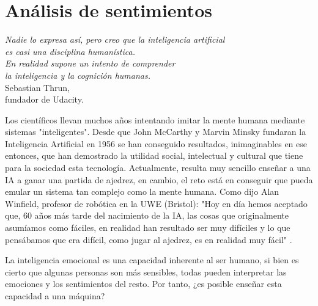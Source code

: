 \section{Análisis de sentimientos}

\begin{flushright}
\begin{minipage}[b][4cm][t]{11cm}
\begin{flushright}
{\small \emph{Nadie lo expresa así, pero creo que la inteligencia artificial  }} \vspace{-1pt} \\
{\small \emph{es casi una disciplina humanística. }} \vspace{-1pt} \\
{\small \emph{En realidad supone un intento de comprender  }} \vspace{-1pt} \\
{\small \emph{la inteligencia y la cognición humanas.}} \vspace{1mm}\\
{\footnotesize Sebastian Thrun,} \vspace{-1.5pt} \\
{\footnotesize fundador de Udacity.\phantom{l}}
\end{flushright}
\end{minipage}
\end{flushright}

\vspace{-10pt}

Los científicos llevan muchos años intentando imitar la mente humana mediante sistemas "inteligentes". Desde que John McCarthy y Marvin Minsky fundaran la Inteligencia Artificial en 1956 se han conseguido resultados, inimaginables en ese entonces, que han demostrado la utilidad social, intelectual y cultural que tiene para la sociedad esta tecnología. Actualmente, resulta muy sencillo enseñar a una IA a ganar una partida de ajedrez, en cambio, el reto está en conseguir que pueda emular un sistema tan complejo como la mente humana. Como dijo Alan Winfield, profesor de robótica en la UWE (Bristol): "Hoy en día hemos aceptado que, 60 años más tarde del nacimiento de la IA, las cosas que originalmente asumíamos como fáciles, en realidad han resultado ser muy difíciles y lo que pensábamos que era difícil, como jugar al ajedrez, es en realidad muy fácil" .

La inteligencia emocional es una capacidad inherente al ser humano, si bien es cierto que algunas personas son más sensibles, todas pueden interpretar las emociones y los sentimientos del resto. Por tanto, ¿es posible enseñar esta capacidad a una máquina?

